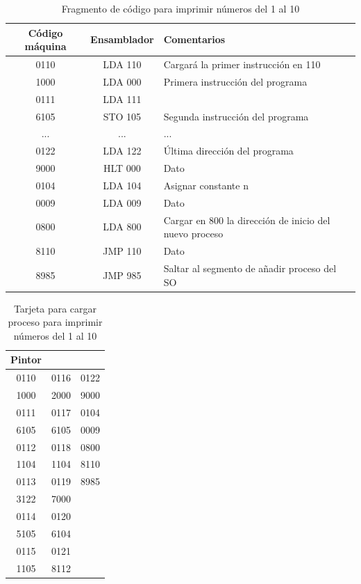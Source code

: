 \documentclass[letterpaper,12pt,oneside]{book}
\begin{document}
		
		\begin{table}[h]
			  \centering
			  \begin{tabular}{|c|c|p{8cm}|}
			    \hline
		    	\textbf{Código máquina} & \textbf{Ensamblador} & \textbf{Comentarios} \\
			    \hline
				0110  & LDA 110 & Cargará la primer instrucción en 110 \\
				\hline
				1000 & LDA 000 & Primera instrucción del programa \\
				\hline
				0111 & LDA 111 & \\
				\hline
				6105 & STO 105 & Segunda instrucción del programa \\
				\hline
				...&...&... \\
 				\hline
				0122 & LDA 122 & Última dirección del programa \\
				\hline
				9000 & HLT 000 & Dato \\
				\hline
				0104 & LDA 104 & Asignar constante n \\
				\hline
				0009 & LDA 009 & Dato \\
				\hline
				0800 & LDA 800 & Cargar en 800 la dirección de inicio del nuevo proceso \\
				\hline
				8110 &  JMP 110 & Dato \\
				\hline
				8985 & JMP 985 & Saltar al segmento de añadir proceso del SO \\
				\hline
			  \end{tabular}
			  \caption{Fragmento de código  para imprimir números del 1 al 10}
			  \label{tab:fragmentoContador1a10}
			\end{table}
		
			\begin{table}[h]
			  \centering
			  \begin{tabular}{|c|c|c|}
			  \hline
				\textbf{Pintor}\\
			  \hline
			    0110	&	0116	&	0122	\\
				1000	&	2000	&	9000	\\
				0111	&	0117	&	0104	\\
				6105	&	6105	&	0009	\\
				0112	&	0118	&	0800	\\
				1104	&	1104	&	8110	\\
				0113	&	0119	&	8985	\\
				3122	&	7000	&		\\
				0114	&	0120	&		\\
				5105	&	6104	&		\\
				0115	&	0121	&		\\
				1105	&	8112	&		\\
				\hline
			  \end{tabular}
			  \caption{Tarjeta para cargar proceso para imprimir números del 1 al 10}
			  \label{tab:tarjetaContador1a10}
			\end{table}
\end{document}
